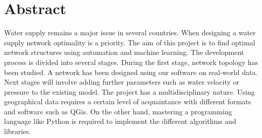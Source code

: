 \newpage
\chapter*{Abstract}


Water supply remains a major issue in several countries. When designing a water supply
network optimality is a priority. The aim of this project is to find optimal network
structures using automation and machine learning.
The development process is divided into several stages. During the first stage, network
topology has been studied. A network has been designed using our software on real-world
data. 
\vspace{0.5cm}
\noindent Next stages will involve adding further parameters such as water velocity or 
pressure to the existing model. The project has a multidisciplinary nature. Using geographical 
data requires a certain level of acquaintance with different formats and software such as QGis. 
On the other hand, mastering a programming language like Python is required to implement the different
 algorithms and libraries.